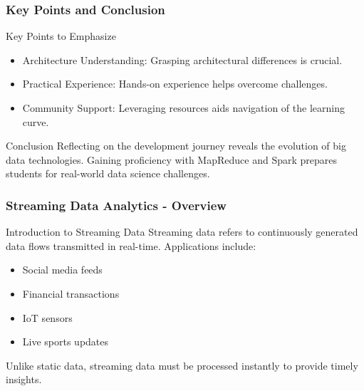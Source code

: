 \documentclass[aspectratio=169]{beamer}
\begin{document}
\begin{frame}[fragile]
    \frametitle{Key Points and Conclusion}

    \begin{block}{Key Points to Emphasize}
        \begin{itemize}
            \item Architecture Understanding: Grasping architectural differences is crucial.
            \item Practical Experience: Hands-on experience helps overcome challenges.
            \item Community Support: Leveraging resources aids navigation of the learning curve.
        \end{itemize}
    \end{block}

    \begin{block}{Conclusion}
        Reflecting on the development journey reveals the evolution of big data technologies. Gaining proficiency with MapReduce and Spark prepares students for real-world data science challenges.
    \end{block}
\end{frame}

\begin{frame}[fragile]
    \frametitle{Streaming Data Analytics - Overview}
    \begin{block}{Introduction to Streaming Data}
        Streaming data refers to continuously generated data flows transmitted in real-time. Applications include:
        \begin{itemize}
            \item Social media feeds
            \item Financial transactions
            \item IoT sensors
            \item Live sports updates
        \end{itemize}
        Unlike static data, streaming data must be processed instantly to provide timely insights.
    \end{block}
\end{frame}
\end{document}
